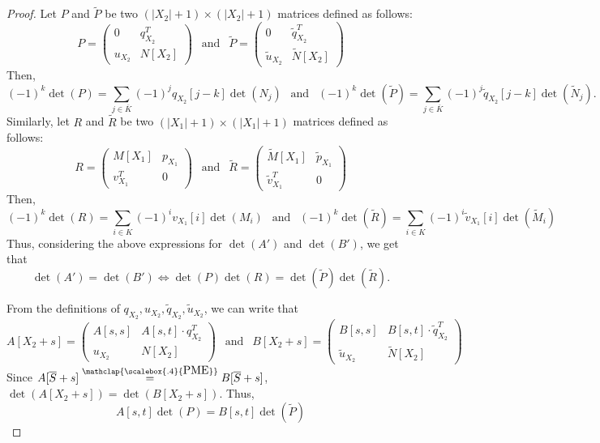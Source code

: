 \documentclass[11pt,letterpaper]{article}
\newcommand{\comp}[1]{\overline{#1}}
\newcommand{\PME}{\stackrel{\mathclap{\scalebox{.4}{\mbox{PME}}}}{=}}
\begin{document}
{{{\begin{proof}
Let $P$ and $\widetilde P$ be two $(|X_2|+1)\times (|X_2|+1)$ matrices defined as follows:
\[
P=
\begin{pmatrix}
0       & q_{X_2}^T\\
u_{X_2} & N[X_2]
\end{pmatrix}
\:\:\text{ and }\:\:
\widetilde P=
\begin{pmatrix}
0       & \tilde q_{X_2}^T\\
\tilde u_{X_2} & \widetilde N[X_2]
\end{pmatrix}
\]
Then, 
$$(-1)^k\det(P)      =  \sum_{j\in\comp{K}}(-1)^j q_{X_2}[j-k]\det(N_j) \:\:\text{ and }\:\: (-1)^k\det(\widetilde P) =  \sum_{j\in\comp{K}}(-1)^j \tilde q_{X_2}[j-k]\det(\widetilde N_j).$$
Similarly, let $R$ and $\widetilde R$ be two $(|X_1|+1)\times (|X_1|+1)$ matrices defined as follows:
\[
R=
\begin{pmatrix}
M[X_1]      & p_{X_1}\\
v_{X_1}^T & 0
\end{pmatrix}
\:\:\text{ and }\:\:
\widetilde R=
\begin{pmatrix}
\widetilde M[X_1]      & \tilde p_{X_1}\\
\tilde v_{X_1}^T & 0
\end{pmatrix}
\]
Then, 
$$(-1)^k \det(R)            =  \sum_{i\in K}(-1)^i v_{X_1}[i]\det(M_i)\:\: \text{ and }\:\: (-1)^k \det(\widetilde R) =  \sum_{i\in K}(-1)^i \tilde v_{X_1}[i]\det(\widetilde M_i)$$
Thus, considering the above expressions for $\det(A')$ and $\det(B')$, we get that $$\det(A')=\det(B')\Longleftrightarrow \det(P)\det(R)=\det(\widetilde P)\det(\widetilde R).$$  

From the definitions of $q_{X_2}, u_{X_2}, \tilde q_{X_2}, \tilde u_{X_2}$, we can write that 
\[
A[X_2+s]=
\begin{pmatrix}
A[s,s]      & A[s, t]\cdot q_{X_2}^T\\
u_{X_2} & N[X_2]
\end{pmatrix}
\:\:\text{ and }\:\:
B[X_2+s]=
\begin{pmatrix}
B[s,s]      & B[s, t]\cdot \tilde q_{X_2}^T\\
\tilde u_{X_2} & \widetilde N[X_2]
\end{pmatrix}
\]
Since $A[\comp{S}+s]\PME B[\comp{S}+s]$, $\det(A[X_2+s])=\det(B[X_2+s])$. Thus, 
\begin{equation}
\label{eqn:decomp_bottom-part}
A[s, t]\det(P)=B[s, t]\det(\widetilde P)  
\end{equation}
 


\end{proof}}}}
\end{document}
